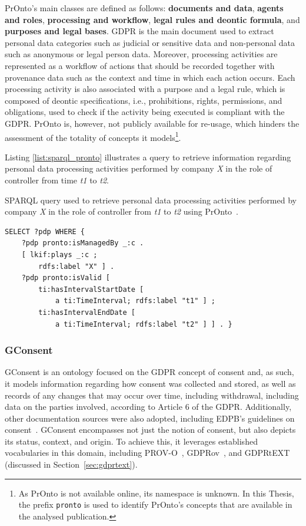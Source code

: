 PrOnto's main classes are defined as follows: \textbf{documents and data}, \textbf{agents and roles}, \textbf{processing and workflow}, \textbf{legal rules and deontic formula}, and \textbf{purposes and legal bases}.
GDPR is the main document used to extract personal data categories such as judicial or sensitive data and non-personal data such as anonymous or legal person data.
Moreover, processing activities are represented as a workflow of actions that should be recorded together with provenance data such as the context and time in which each action occurs.
Each processing activity is also associated with a purpose and a legal rule, which is composed of deontic specifications, i.e., prohibitions, rights, permissions, and obligations, used to check if the activity being executed is compliant with the GDPR. PrOnto is, however, not publicly available for re-usage, which hinders the assessment of the totality of concepts it models\footnote{As PrOnto is not available online, its namespace is unknown. In this Thesis, the prefix \texttt{pronto} is used to identify PrOnto's concepts that are available in the analysed publication.}. 

Listing \ref{list:sparql_pronto} illustrates a query to retrieve information regarding personal data processing activities performed by company \textit{X} in the role of controller from time \textit{t1} to \textit{t2}.

\begin{listing}[ht]
\caption{SPARQL query used to retrieve personal data processing activities performed by company \textit{X} in the role of controller from \textit{t1} to \textit{t2} using PrOnto~\citep{ko_pronto_2018}.}
\label{list:sparql_pronto}
\begin{verbatim}
SELECT ?pdp WHERE {
    ?pdp pronto:isManagedBy _:c .
    [ lkif:plays _:c ;
        rdfs:label "X" ] .
    ?pdp pronto:isValid [
        ti:hasIntervalStartDate [ 
            a ti:TimeInterval; rdfs:label "t1" ] ;
        ti:hasIntervalEndDate [ 
            a ti:TimeInterval; rdfs:label "t2" ] ] . }
\end{verbatim}
\end{listing}

\subsubsection{GConsent}
\label{sec:gconsent}

GConsent \citep{hitzler_gconsent_2019} is an ontology focused on the GDPR concept of consent and, as such, it models information regarding how consent was collected and stored, as well as records of any changes that may occur over time, including withdrawal, including data on the parties involved, according to Article 6 of the GDPR.
Additionally, other documentation sources were also adopted, including EDPB's guidelines on consent~\citep{european_data_protection_board_guidelines_2020}.
GConsent encompasses not just the notion of consent, but also depicts its status, context, and origin.
To achieve this, it leverages established vocabularies in this domain, including PROV-O~\citep{lebo_prov-o_2013}, GDPRov~\citep{pandit_modelling_2017}, and GDPRtEXT~\citep{gangemi_gdprtext_2018} (discussed in Section~\ref{sec:gdprtext}).

